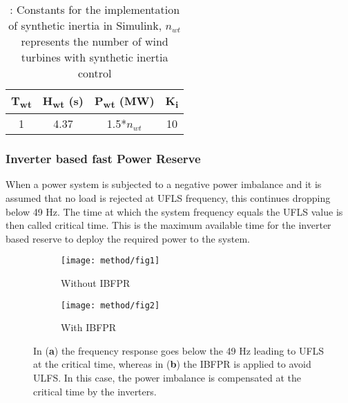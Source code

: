 \begin{table}[h]
	\caption{\label{tb:inertia}: Constants for the implementation of synthetic inertia in Simulink, $ n_{wt} $ represents the number of wind turbines with synthetic inertia control}
	\centering
	\begin{tabular}{cccc}
		\toprule
		\textbf{T\textsubscript{wt}} & \textbf{ H\textsubscript{wt} (s)}    & \textbf{ P\textsubscript{wt} (MW)} & \textbf{ K\textsubscript{i}} \\
		\midrule
		1 & 4.37 & 1.5*$ n_{wt} $ & 10 \\
		\bottomrule
	\end{tabular}
\end{table}

\subsubsection{Inverter based fast Power Reserve}

When a power system is subjected to a negative power imbalance and it is assumed that no load is rejected at UFLS frequency, this continues dropping below 49 Hz. The time at which the system frequency equals the UFLS value is then called critical time. This is the maximum available time for the inverter based reserve to deploy the required power to the system.

\begin{figure}[h]
	\centering
	\begin{subfigure}[h]{0.45\textwidth}
		\centering
		\texttt{[image: method/fig1]}
		\caption{Without IBFPR}
		\label{fig:freqresp_before}
	\end{subfigure}
	\hfill
	\begin{subfigure}[h]{0.45\textwidth}
		\centering
		\texttt{[image: method/fig2]}
		\caption{With IBFPR}
		\label{fig:freqresp_after}
	\end{subfigure}
	
	
	\caption{In (\textbf{a}) the frequency response goes below the 49 Hz leading to UFLS at the critical time, whereas in (\textbf{b}) the IBFPR is applied to avoid ULFS. In this case, the power imbalance is compensated at the critical time by the inverters.}
\end{figure}

